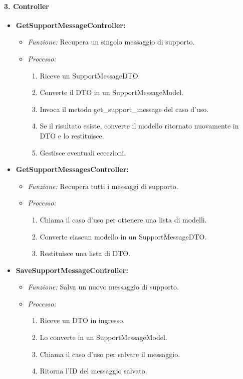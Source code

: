     \paragraph{3. Controller}
    \begin{itemize}
        \item \textbf{GetSupportMessageController:}
        \begin{itemize}
            \item \textit{Funzione:} Recupera un singolo messaggio di supporto.
            \item \textit{Processo:}
            \begin{enumerate}
                \item Riceve un SupportMessageDTO.
                \item Converte il DTO in un SupportMessageModel.
                \item Invoca il metodo get\_support\_message del caso d’uso.
                \item Se il risultato esiste, converte il modello ritornato nuovamente in DTO e lo restituisce.
                \item Gestisce eventuali eccezioni.
            \end{enumerate}
        \end{itemize}
        \item \textbf{GetSupportMessagesController:}
        \begin{itemize}
            \item \textit{Funzione:} Recupera tutti i messaggi di supporto.
            \item \textit{Processo:}
            \begin{enumerate}
                \item Chiama il caso d’uso per ottenere una lista di modelli.
                \item Converte ciascun modello in un SupportMessageDTO.
                \item Restituisce una lista di DTO.
            \end{enumerate}
        \end{itemize}
        \item \textbf{SaveSupportMessageController:}
        \begin{itemize}
            \item \textit{Funzione:} Salva un nuovo messaggio di supporto.
            \item \textit{Processo:}
            \begin{enumerate}
                \item Riceve un DTO in ingresso.
                \item Lo converte in un SupportMessageModel.
                \item Chiama il caso d’uso per salvare il messaggio.
                \item Ritorna l’ID del messaggio salvato.
            \end{enumerate}
        \end{itemize}
    \end{itemize}

